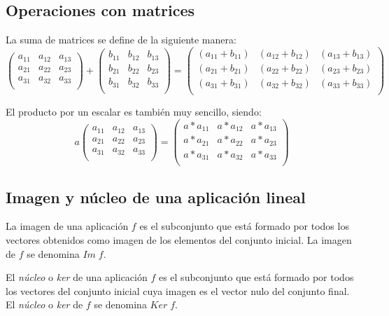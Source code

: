 \documentclass[11pt, oneside, titlepage]{article}
\begin{document}
\subsection{Operaciones con matrices}
La suma de matrices se define de la siguiente manera:
\[
\begin{pmatrix}
  a_{11} & a_{12} & a_{13} \\ 
  a_{21} & a_{22} & a_{23} \\
  a_{31} & a_{32} & a_{33} \\
\end{pmatrix}
+
\begin{pmatrix}
  b_{11} & b_{12} & b_{13} \\ 
  b_{21} & b_{22} & b_{23} \\
  b_{31} & b_{32} & b_{33} \\
\end{pmatrix}
=
\begin{pmatrix}
  (a_{11} + b_{11}) & (a_{12} + b_{12}) & (a_{13} + b_{13}) \\ 
  (a_{21} + b_{21}) & (a_{22} + b_{22}) & (a_{23} + b_{23}) \\
  (a_{31} + b_{31}) & (a_{32} + b_{32}) & (a_{33} + b_{33}) \\
\end{pmatrix}
\]

El producto por un escalar es también muy sencillo, siendo:
\[
a
\begin{pmatrix}
  a_{11} & a_{12} & a_{13} \\ 
  a_{21} & a_{22} & a_{23} \\
  a_{31} & a_{32} & a_{33} \\
\end{pmatrix}
=
\begin{pmatrix}
  a*a_{11} & a*a_{12} & a*a_{13} \\ 
  a*a_{21} & a*a_{22} & a*a_{23} \\
  a*a_{31} & a*a_{32} & a*a_{33} \\
\end{pmatrix}
\]

\subsection{Imagen y núcleo de una aplicación lineal}
La imagen de una aplicación $f$ es el subconjunto que está formado por todos los vectores obtenidos como imagen de los elementos del conjunto inicial. La imagen de $f$ se denomina $Im \; f$.

El \emph{núcleo} o \emph{ker} de una aplicación $f$ es el subconjunto que está formado por todos los vectores del conjunto inicial cuya imagen es el vector nulo del conjunto final. El \emph{núcleo} o \emph{ker} de $f$ se denomina $Ker \; f$.
\end{document}
